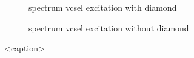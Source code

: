 	\begin{figure}[tp]
		\begin{subfigure}[t]{ 0.49\linewidth}
			\centering
			\caption{spectrum vcsel excitation with diamond}
			\label{subfig::spectrum_vcsel_excitation_with_diamond}
		\end{subfigure}
		\hfill
		\begin{subfigure}[t]{ 0.49\linewidth}
			\centering
			\caption{spectrum vcsel excitation without diamond}
			\label{subfig::spectrum_vcsel_excitation_without_diamond}
		\end{subfigure}
		\caption{<caption>}
		\label{fig::<fig>}
	\end{figure}